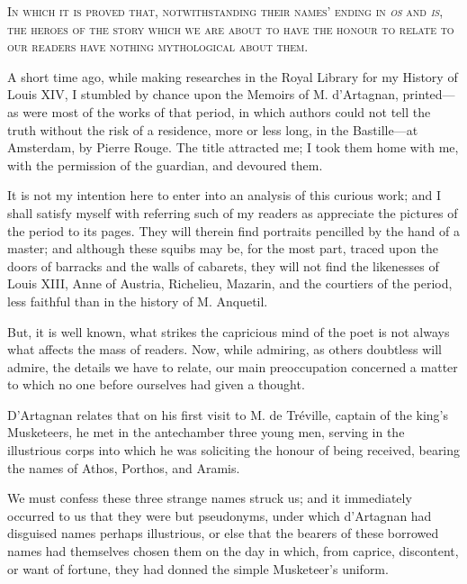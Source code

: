 

\begin{center}\scshape
In which it is proved that, notwithstanding their names' ending in \textit{os} and \textit{is}, the heroes of the story which we are about to have the honour to relate to our readers have nothing mythological about them. 
\end{center}
	
\lettrine{A}{} short time ago, while making researches in the Royal Library for my History of Louis XIV, I stumbled by chance upon the Memoirs of M. d'Artagnan, printed---as were most of the works of that period, in which authors could not tell the truth without the risk of a residence, more or less long, in the Bastille---at Amsterdam, by Pierre Rouge. The title attracted me; I took them home with me, with the permission of the guardian, and devoured them. 

It is not my intention here to enter into an analysis of this curious work; and I shall satisfy myself with referring such of my readers as appreciate the pictures of the period to its pages. They will therein find portraits pencilled by the hand of a master; and although these squibs may be, for the most part, traced upon the doors of barracks and the walls of cabarets, they will not find the likenesses of Louis XIII, Anne of Austria, Richelieu, Mazarin, and the courtiers of the period, less faithful than in the history of M. Anquetil. 

But, it is well known, what strikes the capricious mind of the poet is not always what affects the mass of readers. Now, while admiring, as others doubtless will admire, the details we have to relate, our main preoccupation concerned a matter to which no one before ourselves had given a thought. 

D'Artagnan relates that on his first visit to M. de Tréville, captain of the king's Musketeers, he met in the antechamber three young men, serving in the illustrious corps into which he was soliciting the honour of being received, bearing the names of Athos, Porthos, and Aramis. 

We must confess these three strange names struck us; and it immediately occurred to us that they were but pseudonyms, under which d'Artagnan had disguised names perhaps illustrious, or else that the bearers of these borrowed names had themselves chosen them on the day in which, from caprice, discontent, or want of fortune, they had donned the simple Musketeer's uniform. 

